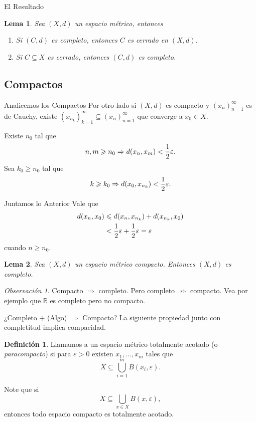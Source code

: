 \documentclass[utf8]{beamer}
\theoremstyle{plain}
\newtheorem{Lem}{Lema}                 %
\theoremstyle{definition}
\newtheorem{Def}{Definición}           %
\theoremstyle{remark}
\newtheorem{Rmk}[Th]{Observación}      %
\numberwithin{equation}{section}
\newcommand{\eps}{\varepsilon}          %
\newcommand{\bR}{\mathbb{R}}    %
\renewcommand{\geq}{\geqslant}          %
\renewcommand{\leq}{\leqslant}          %
\newcommand{\To}{\Rightarrow}
\newcommand{\half}{{\mathchoice{\nhalf}{\thalf}{\shalf}{\shalf}}} %
\newcommand{\nhalf}{\frac{1}{2}}
\newcommand{\shalf}{{\scriptstyle\frac{1}{2}}} %
\newcommand{\thalf}{{\tfrac{1}{2}}} %
\newcommand{\sucn}{_{n=1}^\infty} %
\newcommand{\suck}{_{k=1}^\infty} %
\begin{document}
\begin{frame}{El Resultado}
  \begin{Lem}
    Sea $(X,d)$ un espacio métrico, entonces 
    \begin{enumerate}
      \item Si $(C,d)$ es completo, entonces $C$ es cerrado en $(X,d)$.
      \item Si $C\subseteq X$ es cerrado, entonces $(C,d)$ es completo.
    \end{enumerate}
  \end{Lem}
\end{frame}

\subsection{Compactos}

\begin{frame}{Analicemos los Compactos}
  Por otro lado si $(X,d)$ es compacto y $(x_n)\sucn$ es de Cauchy, existe $(x_{n_k})\suck\subseteq(x_n)\sucn$ que converge a $x_0\in X$.\par 
  Existe $n_0$ tal que 
  $$n,m\geq n_0\To d(x_n,x_m)<\half\eps.$$
  Sea $k_0\geq n_0$ tal que 
  $$k\geq k_0\To d(x_0,x_{n_k})<\half\eps.$$
\end{frame}

\begin{frame}{Juntamos lo Anterior}
  Vale que 
  \begin{align*}
    d(x_n,x_0)&\leq  d(x_n,x_{n_k})+d(x_{n_k},x_0)\\
    &<\half\eps+\half\eps=\eps
  \end{align*}
  cuando $n\geq n_0$. 
  \begin{Lem}
    Sea $(X,d)$ un espacio métrico compacto. Entonces $(X,d)$ es completo.
  \end{Lem}

  \begin{Rmk}
    Compacto $\To$ completo. Pero completo $\not\To$ compacto. Vea por ejemplo que $\bR$ es completo pero no compacto. 
  \end{Rmk}
\end{frame}

\begin{frame}{¿Completo + (Algo) $\To$ Compacto?}
  La siguiente propiedad junto con completitud implica compacidad.
  \begin{Def}
    Llamamos a un espacio métrico \alert{totalmente acotado} (o \emph{paracompacto}) si para $\eps>0$ existen $x_1,\dots,x_m$ tales que
    $$X\subseteq \bigcup_{i=1}^mB(x_i,\eps).$$
  \end{Def}
  Note que si
  $$X\subseteq \bigcup_{x\in X}B(x,\eps),$$
  entonces todo espacio compacto es totalmente acotado.
\end{frame}
\end{document}
